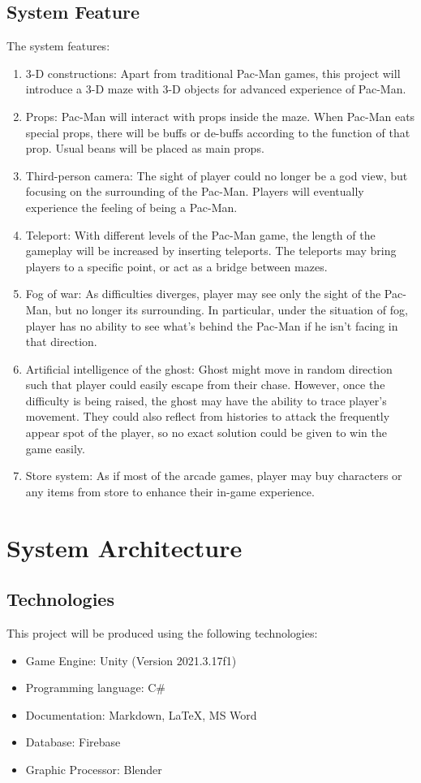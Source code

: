 \documentclass{article}
\begin{document}
\subsection{System Feature}
\par The system features:
\begin{enumerate}
    \item 3-D constructions: Apart from traditional Pac-Man games, this project will introduce a 3-D maze with 3-D objects for advanced experience of Pac-Man.
    \item Props: Pac-Man will interact with props inside the maze. When Pac-Man eats special props, there will be buffs or de-buffs according to the function of that prop. Usual beans will be placed as main props.
    \item Third-person camera: The sight of player could no longer be a god view, but focusing on the surrounding of the Pac-Man. Players will eventually experience the feeling of being a Pac-Man.
    \item Teleport: With different levels of the Pac-Man game, the length of the gameplay will be increased by inserting teleports. The teleports may bring players to a specific point, or act as a bridge between mazes.
    \item Fog of war: As difficulties diverges, player may see only the sight of the Pac-Man, but no longer its surrounding. In particular, under the situation of fog, player has no ability to see what's behind the Pac-Man if he isn't facing in that direction.
    \item Artificial intelligence of the ghost: Ghost might move in random direction such that player could easily escape from their chase. However, once the difficulty is being raised, the ghost may have the ability to trace player's movement. They could also reflect from histories to attack the frequently appear spot of the player, so no exact solution could be given to win the game easily.
    \item Store system: As if most of the arcade games, player may buy characters or any items from store to enhance their in-game experience.
\end{enumerate}
\section{System Architecture}
\subsection{Technologies}
\par This project will be produced using the following technologies:
\begin{itemize}
    \item Game Engine: Unity (Version 2021.3.17f1)
    \item Programming language: C\#
    \item Documentation: Markdown, LaTeX, MS Word
    \item Database: Firebase
    \item Graphic Processor: Blender
\end{itemize}
\end{document}
